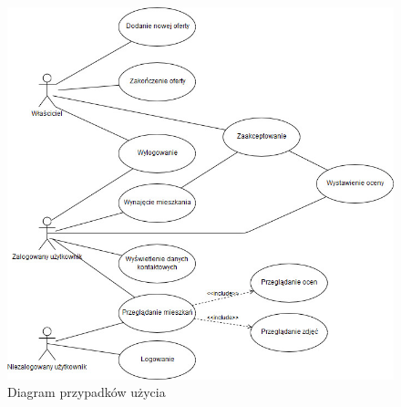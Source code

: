 \documentclass[polish, 11pt]{article}
\begin{document}
    \begin{figure}[H]
        \centering
        \includegraphics[width=\textwidth]{figures/UseCase.jpg}
        \caption{Diagram przypadków użycia}
    \end{figure}
    
\end{document}
